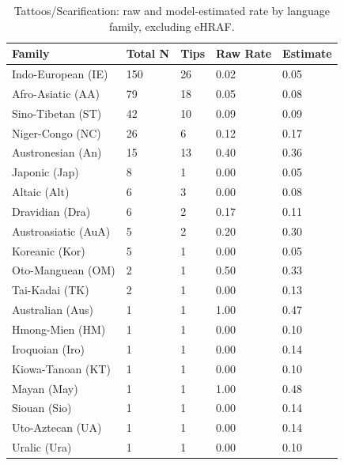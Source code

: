 \begin{table}[!ht]
\centering
\small
\caption{Tattoos/Scarification: raw and model-estimated rate by language family, excluding eHRAF.}
\label{tab:extnoehraf_tattoos_scarification_family}
\begin{tabular}{lllll}
\toprule
Family & Total N & Tips & Raw Rate & Estimate \\
\midrule
Indo-European (IE) & 150 & 26 & 0.02 & 0.05 \\
Afro-Asiatic (AA) & 79 & 18 & 0.05 & 0.08 \\
Sino-Tibetan (ST) & 42 & 10 & 0.09 & 0.09 \\
Niger-Congo (NC) & 26 & 6 & 0.12 & 0.17 \\
Austronesian (An) & 15 & 13 & 0.40 & 0.36 \\
Japonic (Jap) & 8 & 1 & 0.00 & 0.05 \\
Altaic (Alt) & 6 & 3 & 0.00 & 0.08 \\
Dravidian (Dra) & 6 & 2 & 0.17 & 0.11 \\
Austroasiatic (AuA) & 5 & 2 & 0.20 & 0.30 \\
Koreanic (Kor) & 5 & 1 & 0.00 & 0.05 \\
Oto-Manguean (OM) & 2 & 1 & 0.50 & 0.33 \\
Tai-Kadai (TK) & 2 & 1 & 0.00 & 0.13 \\
Australian (Aus) & 1 & 1 & 1.00 & 0.47 \\
Hmong-Mien (HM) & 1 & 1 & 0.00 & 0.10 \\
Iroquoian (Iro) & 1 & 1 & 0.00 & 0.14 \\
Kiowa-Tanoan (KT) & 1 & 1 & 0.00 & 0.10 \\
Mayan (May) & 1 & 1 & 1.00 & 0.48 \\
Siouan (Sio) & 1 & 1 & 0.00 & 0.14 \\
Uto-Aztecan (UA) & 1 & 1 & 0.00 & 0.14 \\
Uralic (Ura) & 1 & 1 & 0.00 & 0.10 \\
\bottomrule
\end{tabular}
\end{table}